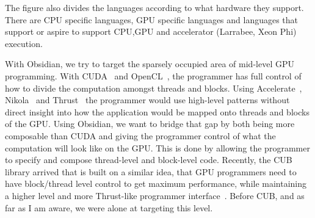 \documentclass[a4paper]{book}
\begin{document}
The figure also divides the languages according to what hardware they support. There 
are CPU specific languages, GPU specific languages and languages that support or aspire 
to support CPU,GPU and accelerator (Larrabee, Xeon Phi) execution. 

With Obsidian, we try to target the sparsely occupied area of mid-level GPU programming. With 
CUDA~\citet{wwwcuda} and OpenCL~\citet{OpenCL}, the programmer has full control of how to divide 
the computation amongst threads and blocks. Using Accelerate~\citet{ACCELERATEDAMP11}, 
Nikola~\citet{NIKOLA} 
and Thrust~\citet{THRUST} the programmer would use 
high-level patterns without direct insight into how the application would be mapped onto 
threads and blocks of the GPU. Using Obsidian, we want to bridge that gap by both being 
more composable than CUDA and giving the programmer control of what the computation will 
look like on the GPU. This is done by allowing the programmer to specify and compose 
thread-level and block-level code. Recently, the CUB library arrived that is built on a 
similar idea, that GPU programmers need to have block/thread level control to get maximum 
performance, while maintaining a higher level and more Thrust-like programmer 
interface~\citet{CUB}. Before CUB, and as far as I am aware, we were alone at targeting 
this level.  
\end{document}
